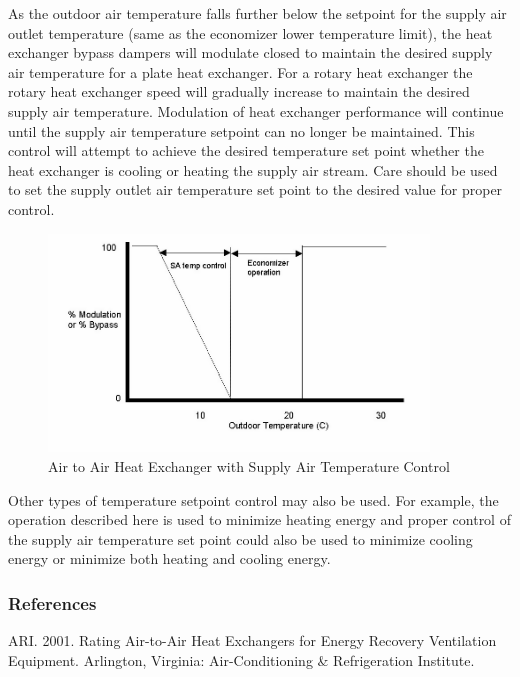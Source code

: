 As the outdoor air temperature falls further below the setpoint for the supply air outlet temperature (same as the economizer lower temperature limit), the heat exchanger bypass dampers will modulate closed to maintain the desired supply air temperature for a plate heat exchanger. For a rotary heat exchanger the rotary heat exchanger speed will gradually increase to maintain the desired supply air temperature. Modulation of heat exchanger performance will continue until the supply air temperature setpoint can no longer be maintained. This control will attempt to achieve the desired temperature set point whether the heat exchanger is cooling or heating the supply air stream. Care should be used to set the supply outlet air temperature set point to the desired value for proper control.

\begin{figure}[hbtp] %
\centering
\includegraphics[width=0.9\textwidth, height=0.9\textheight, keepaspectratio=true]{media/image5550.png}
\caption{Air to Air Heat Exchanger with Supply Air Temperature Control \protect \label{fig:air-to-air-heat-exchanger-with-supply-air}}
\end{figure}

Other types of temperature setpoint control may also be used. For example, the operation described here is used to minimize heating energy and proper control of the supply air temperature set point could also be used to minimize cooling energy or minimize both heating and cooling energy.

\subsubsection{References}\label{references-027}

ARI. 2001. Rating Air-to-Air Heat Exchangers for Energy Recovery Ventilation Equipment. Arlington, Virginia: Air-Conditioning \& Refrigeration Institute.

